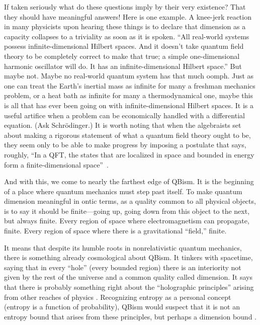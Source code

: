 \documentclass[aps,pra,superscriptaddress,10pt,tightenlines,twocolumn,nofootinbib]{revtex4}
\begin{document}
If taken seriously what do these questions imply by their very existence?  That they should have meaningful answers!  Here is one example.  A knee-jerk reaction in many physicists upon hearing these things is to declare that dimension as a capacity collapses to a triviality as soon as it is spoken.  ``All real-world systems possess infinite-dimensional Hilbert spaces.  And it doesn't take quantum field theory to be completely correct to make that true; a simple one-dimensional harmonic oscillator will do.  It has an infinite-dimensional Hilbert space.''  But maybe not.  Maybe no real-world quantum system has that much oomph.  Just as one can treat the Earth's inertial mass as infinite for many a freshman mechanics problem, or a heat bath as infinite for many a thermodynamical one, maybe this is all that has ever been going on with infinite-dimensional Hilbert spaces.  It is a useful artifice when a problem can be economically handled with a differential equation.  (Ask Schr\"odinger.)  It is worth noting that when the algebraists set about making a rigorous statement of what a quantum field theory ought to be, they seem only to be able to make progress by imposing a postulate that says, roughly, ``In a QFT, the states that are localized in space and bounded in energy form a finite-dimensional space''~\cite{Haag10}.

And with this, we come to nearly the farthest edge of QBism.  It is the beginning of a place where quantum mechanics must step past itself.  To make quantum dimension meaningful in ontic terms, as a quality common to all physical objects, is to say it should be finite---going up, going down from this object to the next, but always finite.  Every region of space where electromagnetism can propagate, finite.  Every region of space where there is a gravitational ``field,'' finite.

It means that despite its humble roots in nonrelativistic quantum mechanics, there is something already cosmological about QBism.  It tinkers with spacetime, saying that in every ``hole'' (every bounded region) there is an interiority not given by the rest of the universe and a common quality called dimension.  It says that there is probably something right about the ``holographic principles'' arising from other reaches of physics \cite{Bekenstein2008}.  Recognizing entropy as a personal concept (entropy is a function of probability), QBism would suspect that it is not an entropy bound that arises from these principles, but perhaps a dimension bound \cite{Fuchs04b,Fuchs10b}.
\end{document}
